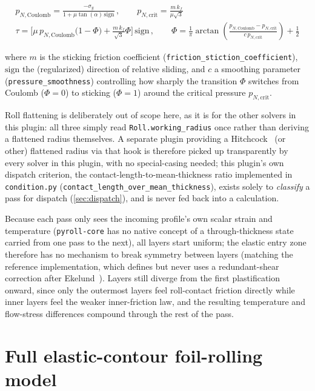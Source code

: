 \documentclass[11pt]{PyRollDocs}
\begin{document}
    \begin{gather}
        p_{N,\mathrm{Coulomb}} = \frac{-\sigma_y}{1 + \mu \tan(\alpha) \,\mathrm{sign}}\,, \qquad
        p_{N,\mathrm{crit}} = \frac{m\, k_f}{\mu \sqrt{3}} \\
        \tau = \Big[ \mu\, p_{N,\mathrm{Coulomb}} \big(1-\Phi\big) + \frac{m\, k_f}{\sqrt{3}} \Phi \Big] \,\mathrm{sign}\,, \qquad
        \Phi = \frac{1}{\pi}\arctan\!\left(\frac{p_{N,\mathrm{Coulomb}} - p_{N,\mathrm{crit}}}{c\, p_{N,\mathrm{crit}}}\right) + \frac12
        \label{eq:mixed-friction}
    \end{gather}

    where $m$ is the sticking friction coefficient (\lstinline{friction_stiction_coefficient}), $\mathrm{sign}$ the (regularized) direction of relative sliding, and $c$ a smoothing parameter (\lstinline{pressure_smoothness}) controlling how sharply the transition $\Phi$ switches from Coulomb ($\Phi=0$) to sticking ($\Phi=1$) around the critical pressure $p_{N,\mathrm{crit}}$.

    Roll flattening is deliberately out of scope here, as it is for the other solvers in this plugin: all three simply read \lstinline{Roll.working_radius} once rather than deriving a flattened radius themselves. A separate plugin providing a Hitchcock~\cite{Hitchcock1935} (or other) flattened radius via that hook is therefore picked up transparently by every solver in this plugin, with no special-casing needed; this plugin's own dispatch criterion, the contact-length-to-mean-thickness ratio implemented in \lstinline{condition.py} (\lstinline{contact_length_over_mean_thickness}), exists solely to \emph{classify} a pass for dispatch (\autoref{sec:dispatch}), and is never fed back into a calculation.

    Because each pass only sees the incoming profile's own scalar strain and temperature (\lstinline{pyroll-core} has no native concept of a through-thickness state carried from one pass to the next), all layers start uniform; the elastic entry zone therefore has no mechanism to break symmetry between layers (matching the reference implementation, which defines but never uses a redundant-shear correction after Ekelund~\cite{Ekelund1933}). Layers still diverge from the first plastification onward, since only the outermost layers feel roll-contact friction directly while inner layers feel the weaker inner-friction law, and the resulting temperature and flow-stress differences compound through the rest of the pass.


    \section{Full elastic-contour foil-rolling model}\label{sec:foil-model}
\end{document}
